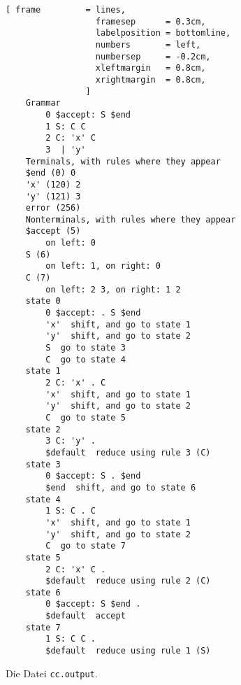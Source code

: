 \begin{figure}[!ht]
\centering
\begin{Verbatim}[ frame         = lines, 
                  framesep      = 0.3cm, 
                  labelposition = bottomline,
                  numbers       = left,
                  numbersep     = -0.2cm,
                  xleftmargin   = 0.8cm,
                  xrightmargin  = 0.8cm,
                ]
    Grammar
        0 $accept: S $end
        1 S: C C
        2 C: 'x' C
        3  | 'y'
    Terminals, with rules where they appear
    $end (0) 0
    'x' (120) 2
    'y' (121) 3
    error (256)
    Nonterminals, with rules where they appear
    $accept (5)
        on left: 0
    S (6)
        on left: 1, on right: 0
    C (7)
        on left: 2 3, on right: 1 2
    state 0
        0 $accept: . S $end
        'x'  shift, and go to state 1
        'y'  shift, and go to state 2
        S  go to state 3
        C  go to state 4
    state 1
        2 C: 'x' . C
        'x'  shift, and go to state 1
        'y'  shift, and go to state 2
        C  go to state 5
    state 2
        3 C: 'y' .
        $default  reduce using rule 3 (C)
    state 3
        0 $accept: S . $end
        $end  shift, and go to state 6
    state 4
        1 S: C . C
        'x'  shift, and go to state 1
        'y'  shift, and go to state 2
        C  go to state 7
    state 5
        2 C: 'x' C .
        $default  reduce using rule 2 (C)
    state 6
        0 $accept: S $end .
        $default  accept
    state 7
        1 S: C C .
        $default  reduce using rule 1 (S)
\end{Verbatim}
\vspace*{-0.3cm}
\caption{Die Datei \texttt{cc.output}.}
\label{fig:cc.output}
\end{figure} 

